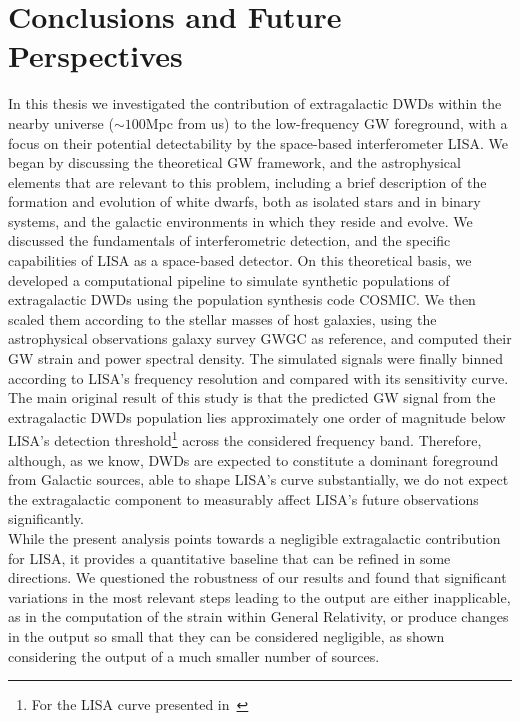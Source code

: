 \chapter*{Conclusions and Future Perspectives}
In this thesis we investigated the contribution of extragalactic DWDs within the nearby universe ($\sim100$Mpc from us) to the low-frequency GW foreground, with a focus on their potential detectability by the space-based interferometer LISA.
We began by discussing the theoretical GW framework, and the astrophysical elements that are relevant to this problem, including a brief description of the formation and evolution of white dwarfs, both as isolated stars and in binary systems, and the galactic environments in which they reside and evolve.
We discussed the fundamentals of interferometric detection, and the specific capabilities of LISA as a space-based detector.
On this theoretical basis, we developed a computational pipeline to simulate synthetic populations of extragalactic DWDs using the population synthesis code COSMIC.
We then scaled them according to the stellar masses of host galaxies, using the astrophysical observations galaxy survey GWGC as reference, and computed their GW strain and power spectral density.
The simulated signals were finally binned according to LISA’s frequency resolution and compared with its sensitivity curve.\vspace{3mm}\\ 
The main original result of this study is that the predicted GW signal from the extragalactic DWDs population lies approximately one order of magnitude below LISA’s detection threshold\footnote{For the LISA curve presented in~\cite{Robson_2019}} across the considered frequency band.
Therefore, although, as we know, DWDs are expected to constitute a dominant foreground from Galactic sources, able to shape LISA's curve substantially, we do not expect the extragalactic component to measurably affect LISA's future observations significantly.\vspace{3mm}\\ 
While the present analysis points towards a negligible extragalactic contribution for LISA, it provides a quantitative baseline that can be refined in some directions.
We questioned the robustness of our results and found that significant variations in the most relevant steps leading to the output are either inapplicable, as in the computation of the strain within General Relativity, or produce changes in the output so small that they can be considered negligible, as shown considering the output of a much smaller number of sources.\vspace{3mm}\\
